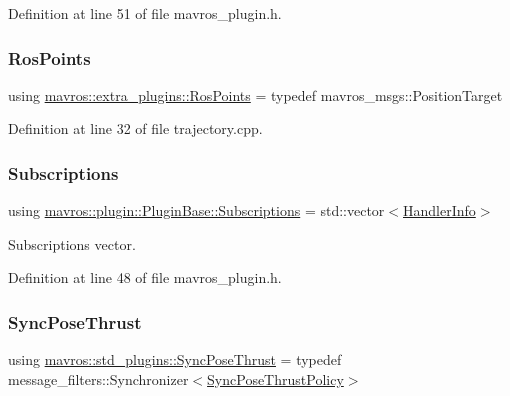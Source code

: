 Definition at line 51 of file mavros\+\_\+plugin.\+h.

\mbox{\label{group__plugin_ga93699d5632be3dfe1bb548ed5a0b4171}} 
\subsubsection{\texorpdfstring{RosPoints}{RosPoints}}
{\footnotesize\ttfamily using \mbox{\hyperlink{group__plugin_ga93699d5632be3dfe1bb548ed5a0b4171}{mavros\+::extra\+\_\+plugins\+::\+Ros\+Points}} = typedef mavros\+\_\+msgs\+::\+Position\+Target}



Definition at line 32 of file trajectory.\+cpp.

\mbox{\label{group__plugin_ga8967d61fc77040e0c3ea5a4585d62a09}} 
\subsubsection{\texorpdfstring{Subscriptions}{Subscriptions}}
{\footnotesize\ttfamily using \mbox{\hyperlink{group__plugin_ga8967d61fc77040e0c3ea5a4585d62a09}{mavros\+::plugin\+::\+Plugin\+Base\+::\+Subscriptions}} =  std\+::vector$<$\mbox{\hyperlink{group__plugin_gab973eb02b8f26a7b2b9cea37924317f1}{Handler\+Info}}$>$}



Subscriptions vector. 



Definition at line 48 of file mavros\+\_\+plugin.\+h.

\mbox{\label{group__plugin_gab78f646d4cfccf2c656a3aeb2605cad1}} 
\subsubsection{\texorpdfstring{SyncPoseThrust}{SyncPoseThrust}}
{\footnotesize\ttfamily using \mbox{\hyperlink{group__plugin_gab78f646d4cfccf2c656a3aeb2605cad1}{mavros\+::std\+\_\+plugins\+::\+Sync\+Pose\+Thrust}} = typedef message\+\_\+filters\+::\+Synchronizer$<$\mbox{\hyperlink{group__plugin_ga48ed4062810bb42590cbed0b4e0dc237}{Sync\+Pose\+Thrust\+Policy}}$>$}




